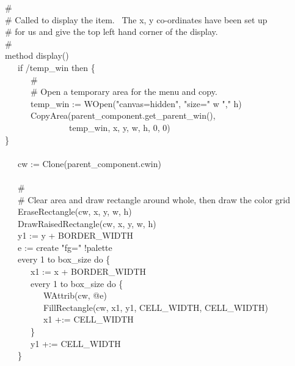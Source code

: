 {\>   \# \\
\>   \# Called to display the item. \ The x, y co-ordinates have been set up \\
\>   \# for us and give the top left hand corner of the display.  \\
\>   \# \\
\>   method display() \\
\>   \ \ \ if /temp\_win then \{ \\
\>   \ \ \ \ \ \ \# \\
\>   \ \ \ \ \ \ \# Open a temporary area for the menu and copy. \\
\>   \ \ \ \ \ \ temp\_win := WOpen("canvas=hidden",
                                    "size=" {\textbar}{\textbar} w
                            {\textbar}{\textbar} "," {\textbar}{\textbar} h) \\
\>   \ \ \ \ \ \ CopyArea(parent\_component.get\_parent\_win(), \\
\>   \ \ \ \ \ \ \ \ \ \ \ \ \ \ \ temp\_win, x, y, w, h, 0, 0) \\
\>\>   \} \\
\ \\
\>   \ \ \ cw := Clone(parent\_component.cwin) \\
\ \\
\>   \ \ \ \# \\
\>   \ \ \ \# Clear area and draw rectangle around whole, then draw the color grid \\
\>   \ \ \ EraseRectangle(cw, x, y, w, h) \\
\>   \ \ \ DrawRaisedRectangle(cw, x, y, w, h) \\
\>   \ \ \ y1 := y + BORDER\_WIDTH \ \ \ \ \  \\
\>   \ \ \ e := create "fg=" {\textbar}{\textbar} !palette \\
\>   \ \ \ every 1 to box\_size do \{ \\
\>   \ \ \ \ \ \ x1 := x + BORDER\_WIDTH \  \\
\>   \ \ \ \ \ \ every 1 to box\_size do \{ \\
\>   \ \ \ \ \ \ \ \ \ WAttrib(cw, @e) \\
\>   \ \ \ \ \ \ \ \ \ FillRectangle(cw, x1, y1, CELL\_WIDTH, CELL\_WIDTH) \\
\>   \ \ \ \ \ \ \ \ \ x1 +:= CELL\_WIDTH \\
\>   \ \ \ \ \ \ \} \\
\>   \ \ \ \ \ \ y1 +:= CELL\_WIDTH \\
\>   \ \ \ \} \\
}
